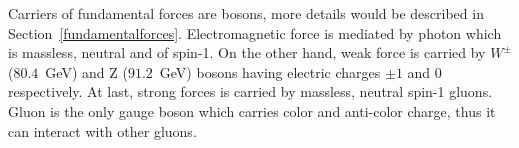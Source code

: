  \par Carriers of fundamental forces are bosons, more details would be described in Section~\ref{fundamentalforces}. Electromagnetic force is mediated by photon which is massless, neutral and of spin-1. On the other hand, weak force is carried by $W^{\pm}$ ($80.4$~GeV) and Z ($91.2$~GeV) bosons having electric charges $\pm1$ and $0$ respectively. 
 At last, strong forces is carried by massless, neutral spin-1 gluons. 
 Gluon is the only gauge boson which carries color and anti-color charge, thus it can interact with other gluons.





